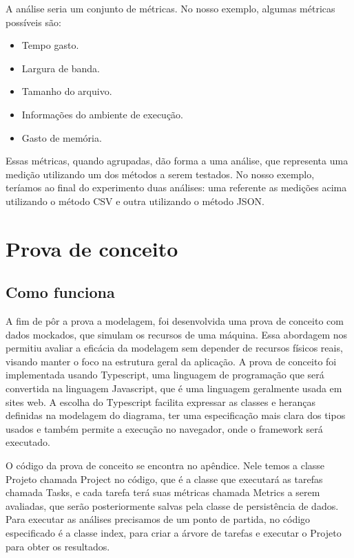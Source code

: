 \documentclass[12pt]{tcc}
\begin{document}
A análise seria um conjunto de métricas. No nosso exemplo, algumas métricas possíveis são:

\begin{itemize}
	\item Tempo gasto.
	\item Largura de banda.
	\item Tamanho do arquivo.
	\item Informações do ambiente de execução.
	\item Gasto de memória.
\end{itemize}

Essas métricas, quando agrupadas, dão forma a uma análise, que representa uma medição utilizando um dos métodos a serem testados. No nosso exemplo, teríamos ao final do experimento duas análises: uma referente as medições acima utilizando o método CSV e outra utilizando o método JSON.




\chapter{Prova de conceito}
\label{cap:prova_de_conceito}
\section{Como funciona}
A fim de pôr a prova a modelagem, foi desenvolvida uma prova de conceito com dados mockados, que simulam os recursos de uma máquina. Essa abordagem nos permitiu avaliar a eficácia da modelagem sem depender de recursos físicos reais, visando manter o foco na estrutura geral da aplicação. A prova de conceito foi implementada usando Typescript, uma linguagem de programação que será convertida na linguagem Javascript, que é uma linguagem geralmente usada em sites web. A escolha do Typescript facilita expressar as classes e heranças definidas na modelagem do diagrama, ter uma especificação mais clara dos tipos usados e também permite a execução no navegador, onde o framework será executado.

O código da prova de conceito se encontra no apêndice. Nele temos a classe Projeto chamada Project no código, que é a classe que executará as tarefas chamada Tasks, e cada tarefa terá suas métricas chamada Metrics a serem avaliadas, que serão posteriormente salvas pela classe de persistência de dados. Para executar as análises precisamos de um ponto de partida, no código especificado é a classe index, para criar a árvore de tarefas e executar o Projeto para obter os resultados.
\end{document}
